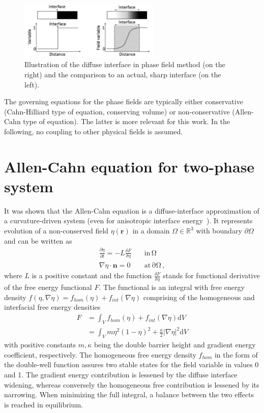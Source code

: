 \begin{figure}
	\centering
	\includegraphics[width = 0.6\textwidth]{chapters/03PFintro/image/diffuse_interface_Bellemans2017}
	\caption{Illustration of the diffuse interface in phase field method (on the right) and the comparison to an actual, sharp interface (on the left).~\cite{Bellemans2017}}
	\label{fig_PFintro_diffuse_interface}
\end{figure}

The governing equations for the phase fields are typically either conservative (Cahn-Hilliard type of equation, conserving volume) or non-conservative (Allen-Cahn type of equation). The latter is more relevant for this work. In the following, no coupling to other physical fields is assumed.

\section{Allen-Cahn equation for two-phase system}
It was shown that the Allen-Cahn equation is a diffuse-interface approximation of a curvature-driven system (even for anisotropic interface energy~\cite{Elliott1996}). It represents evolution of a non-conserved field $\eta(\mathbf{r})$ in a domain $\Omega\in\mathbb{R}^3$ with boundary $\partial\Omega$ and can be written as
\begin{align}
	\frac{\partial \eta}{\partial t} = -L\frac{\delta F}{\delta \eta} \quad &\mathrm{in \,\Omega}\\
	\nabla\eta\cdot\bm{n} = 0 \quad &\mathrm{at \, \partial\Omega}\,,
\end{align}
where $L$ is a positive constant and the function $\frac{\delta F}{\delta \eta}$ stands for functional derivative of the free energy functional $F$. The functional is an integral with free energy density $f(\eta,\nabla\eta)=f_{hom}(\eta)+f_{int}(\nabla\eta)$ comprising of the homogeneous and interfacial free energy densities
\begin{align}
	F 	&= \int_V f_{hom}(\eta)+f_{int}(\nabla\eta) \mathrm{d}V\\
		&= \int_V m \eta^2(1-\eta)^2 + \frac{\kappa}{2}|\nabla\eta|^2 \mathrm{d}V
\end{align}
with positive constants $m,\kappa$ being the double barrier height and gradient energy coefficient, respectively. The homogeneous free energy density $f_{hom}$ in the form of the double-well function assures two stable states for the field variable in values 0 and 1. The gradient energy contribution is lessened by the diffuse interface widening, whereas conversely the homogeneous free contribution is lessened by its narrowing. When minimizing the full integral, a balance between the two effects is reached in equilibrium.

